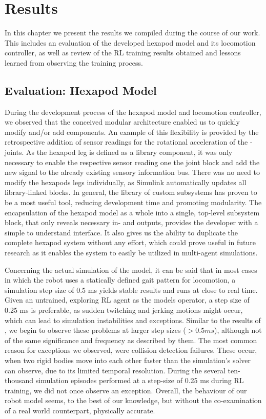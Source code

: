 \chapter{Results}
\label{ch:results}

In this chapter we present the results we compiled during the course of our work.
This includes an evaluation of the developed hexapod model and its locomotion controller, as well as review of the RL training results obtained and lessons learned from observing the training process.

\section{Evaluation: Hexapod Model}
During the development process of the hexapod model and locomotion controller, we observed that the conceived modular architecture enabled us to quickly modify and/or add components.
An example of this flexibility is provided by the retrospective addition of sensor readings for the rotational acceleration of the \textalpha-joints.
As the hexapod leg is defined as a library component, it was only necessary to enable the respective sensor reading one the joint block and add the new signal to the already existing sensory information bus. 
There was no need to modify the hexapods legs individually, as Simulink automatically updates all library-linked blocks.
In general, the library of custom subsystems has proven to be a most useful tool, reducing development time and promoting modularity.
The encapsulation of the hexapod model as a whole into a single, top-level subsystem block, that only reveals necessary in- and outputs, provides the developer with a simple to understand interface.
It also gives us the ability to duplicate the complete hexapod system without any effort, which could prove useful in future research as it enables the system to easily be utilized in multi-agent simulations.

Concerning the actual simulation of the model, it can be said that in most cases in which the robot uses a statically defined gait pattern for locomotion, a simulation step size of 0.5 ms yields stable results and runs at close to real time.
Given an untrained, exploring RL agent as the models operator, a step size of 0.25 ms is preferable, as sudden twitching and jerking motions might occur, which can lead to simulation instabilities and exceptions.
Similar to the results of \cite{thilderkvist2015motion}, we begin to observe these problems at larger step sizes ($> 0.5 ms$), although not of the same significance and frequency as described by them. 
The most common reason for exceptions we observed, were collision detection failures.
These occur, when two rigid bodies move into each other faster than the simulation's solver can observe, due to its limited temporal resolution.
During the several ten-thousand simulation episodes performed at a step-size of 0.25 ms during RL training, we did not once observe an exception.
Overall, the behaviour of our robot model seems, to the best of our knowledge, but without the co-examination of a real world counterpart, physically accurate.


